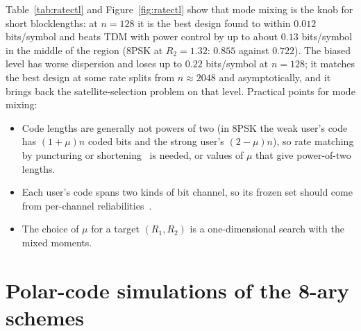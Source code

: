 \documentclass[11pt]{article}
\begin{document}
Table~\ref{tab:ratectl} and Figure~\ref{fig:ratectl} show that mode mixing is the knob for short blocklengths: at $n=128$ it is the best design found to within $0.012$ bits/symbol and beats TDM with power control by up to about $0.13$ bits/symbol in the middle of the region (8PSK at $R_2=1.32$: $0.855$ against $0.722$). The biased level has worse dispersion and loses up to $0.22$ bits/symbol at $n=128$; it matches the best design at some rate splits from $n\approx2048$ and asymptotically, and it brings back the satellite-selection problem on that level. Practical points for mode mixing:
\begin{itemize}
\item Code lengths are generally not powers of two (in 8PSK the weak user's code has $(1+\mu)n$ coded bits and the strong user's $(2-\mu)n$), so rate matching by puncturing or shortening~\cite{3gpp38212,bioglio2021} is needed, or values of $\mu$ that give power-of-two lengths.
\item Each user's code spans two kinds of bit channel, so its frozen set should come from per-channel reliabilities~\cite{trifonov2012ga,mahdavifar2016bicm}.
\item The choice of $\mu$ for a target $(R_1,R_2)$ is a one-dimensional search with the mixed moments.
\end{itemize}

\FloatBarrier
\section{Polar-code simulations of the 8-ary schemes}\label{sec:polar8}
\end{document}
